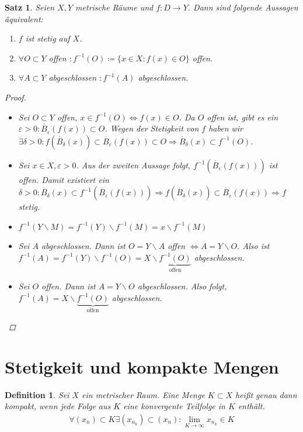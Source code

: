 \documentclass[ngerman,titlepage,twoside, parskip=half*]{scrreprt}
\theoremstyle{break}
\newtheorem{theorem}{Satz}[section]
\newtheorem{definition}{Definition}[chapter]
\theoremstyle{nonumberbreak}
\newtheorem{proof}{Beweis:}
\begin{document}
\begin{theorem}\label{satz:fkt-aquiv}
  Seien $X,Y$ metrische Räume und $f\colon D\rightarrow Y$. Dann sind folgende
  Aussagen äquivalent:
  \begin{enumerate}[(1)]
   \item $f$ ist stetig auf $X$.
   \item $\forall O \subset Y$ offen $\colon f^{-1}(O)\coloneqq\{x\in X\colon
    f(x)\in O\}$ offen.
   \item $\forall A \subset Y$ abgeschlossen $\colon f^{-1}(A)$ abgeschlossen.
  \end{enumerate}
  \begin{proof}
    \begin{itemize}
     \item[(1)$\Rightarrow$ (2)] Sei $O\subset Y$ offen, $x\in
      f^{-1}(O)\Leftrightarrow f(x)\in O$. Da $O$ offen ist, gibt es ein
      $\varepsilon >0\colon\mathring{B_{\varepsilon}} (f(x))\subset O$. Wegen
      der Stetigkeit von $f$ haben wir $\exists \delta >0\colon
      f(\mathring{B_{\delta}}(x))\subset
      \mathring{B_{\varepsilon}}(f(x))\subset O \Longrightarrow
      \mathring{B_{\delta}}(x)\subset f^{-1}(O)$.
     \item[(2)$\Rightarrow$ (1)] Sei $x\in X, \varepsilon >0$. Aus der zweiten
      Aussage folgt, $f^{-1}(\mathring {B_{\varepsilon}}(f(x)))$ ist offen.
      Damit existiert ein $\delta >0\colon\mathring{B_{\delta}}(x)\subset
      f^{-1}(\mathring {B_{\varepsilon}}(f(x)))\Rightarrow
      f(\mathring{B_{\delta}}(x))\subset \mathring{B_{\varepsilon}} (f(x))
      \Rightarrow f$ stetig.
     \item[(2)$\Leftrightarrow$ (3)] $f^{-1}(Y\backslash
      M)=f^{-1}(Y)\backslash f^{-1}(M)=x\backslash f^{-1}(M)$
     \item[(2)$\Rightarrow$ (3)] Sei $A$ abgeschlossen. Dann ist
      $O=Y\backslash A$ offen $\Leftrightarrow A=Y\backslash O$. Also ist
      $f^{-1}(A)=f^{-1}(Y)\backslash f^{-1}(O)=X\backslash
      \underbrace{f^{-1}(O)}_{\text{offen}}$ abgeschlossen.
     \item[(3)$\Rightarrow$ (2)] Sei $O$ offen. Dann ist $A=Y\backslash O$
      abgeschlossen. Also folgt, $f^{-1}(A) =X\backslash
      \underbrace{f^{-1}(O)}_{\text{offen}}$ abgeschlossen.
\end{itemize}
  \end{proof}
\end{theorem}

\section{Stetigkeit und kompakte Mengen}
\begin{definition}
Sei $X$ ein metrischer Raum. Eine Menge $K\subset X$ heißt genau dann \emph{kompakt},
wenn jede Folge aus $K$ eine konvergente Teilfolge in $K$ enthält.
\begin{gather*}\forall (x_n) \subset K \exists (x_{n_k})\subset (x_n)\colon\lim_{K\rightarrow \infty} x_{n_k}\in K\end{gather*}
\end{definition}
\end{document}
